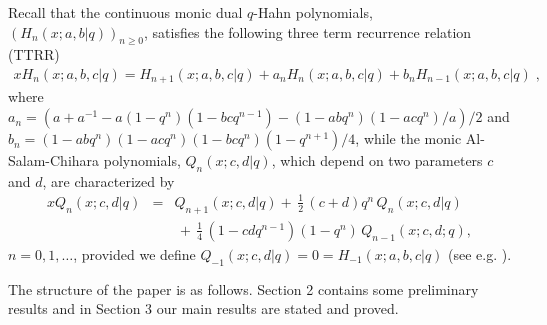 \documentclass{amsart}
\theoremstyle{remark}
\numberwithin{equation}{section}
\begin{document}
 
 Recall that the continuous monic dual $q$-Hahn polynomials, $(H_n(x;a,b|q))_{n\geq 0}$, satisfies the following three term recurrence relation (TTRR)
\begin{align*}
xH_n(x;a,b,c|q)=H_{n+1}(x;a,b,c|q)+a_nH_{n}(x;a,b,c|q)+b_nH_{n-1}(x;a,b,c|q)\;,
\end{align*}
where $a_n=(a+a^{-1}-a(1-q^n)(1-bcq^{n-1}) -(1-abq^n)(1-acq^n)/a)/2$ and $b_n=(1-abq^n)(1-acq^n)(1-bcq^n)(1-q^{n+1})/4$, while the monic Al-Salam-Chihara polynomials, $Q_n(x;c,d|q)$,
which depend on two parameters $c$ and $d$, are characterized by
$$
\begin{array}{rcl}
xQ_{n}(x;c,d|q)&=&Q_{n+1}(x;c,d|q)+\,\mbox{$\frac12$}\,(c+d)q^n\,Q_{n}(x;c,d|q) \\ [0.25em]
&&\displaystyle\, +\,\mbox{$\frac14$}\,(1-cd q^{n-1})(1-q^n)\,Q_{n-1}(x;c,d;q),
\end{array}
$$
$n=0,1,\ldots$, provided we define $Q_{-1}(x;c,d|q)=0=H_{-1}(x;a,b,c|q)$ (see e.g. \cite{IsmailBook2005}).

The structure of the paper is as follows. Section 2 contains some preliminary results and in Section 3 our main results are stated and proved. %
\end{document}
